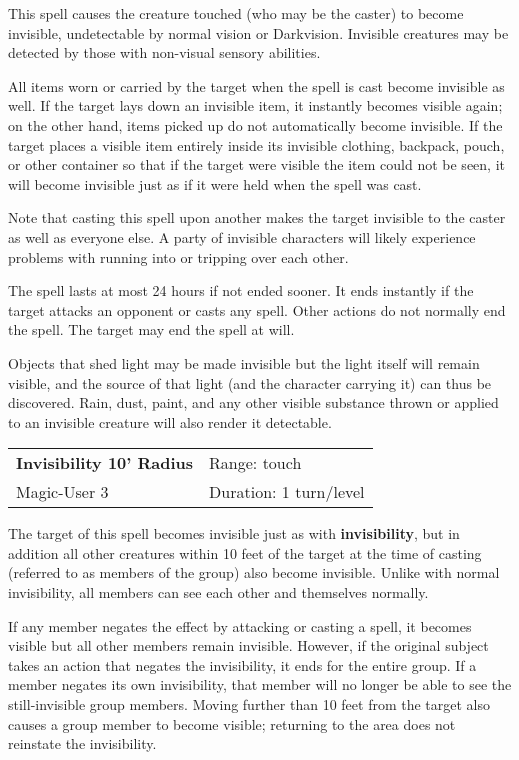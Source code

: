 \documentclass[a4paper,twoside,openany,10pt]{book}
\begin{document}
\begin{multicols}{2}
This spell causes the creature touched (who may be the caster) to become invisible, undetectable by normal vision or Darkvision. Invisible creatures may be detected by those with non-visual sensory abilities.

All items worn or carried by the target when the spell is cast become invisible as well. If the target lays down an invisible item, it instantly becomes visible again; on the other hand, items picked up do not automatically become invisible. If the target places a visible item entirely inside its invisible clothing, backpack, pouch, or other container so that if the target were visible the item could not be seen, it will become invisible just as if it were held when the spell was cast.

Note that casting this spell upon another makes the target invisible to the caster as well as everyone else. A party of invisible characters will likely experience problems with running into or tripping over each other.

The spell lasts at most 24 hours if not ended sooner. It ends instantly if the target attacks an opponent or casts any spell. Other actions do not normally end the spell. The target may end the spell at will. 

Objects that shed light may be made invisible but the light itself will remain visible, and the source of that light (and the character carrying it) can thus be discovered. Rain, dust, paint, and any other visible substance thrown or applied to an invisible creature will also render it detectable.

\smallskip\begin{flushleft} 
	\begin{tabularx}{0.45\textwidth}{@{}m{3.5cm}m{5.5cm}@{}} 
		\textbf{Invisibility 10' Radius} & Range: touch\\
		Magic-User 3 & Duration:  1 turn/level\\
	\end{tabularx}\end{flushleft}

The target of this spell becomes invisible just as with \textbf{invisibility}, but in addition all other creatures within 10 feet of the target at the time of casting (referred to as members of the group) also become invisible. Unlike with normal invisibility, all members can see each other and themselves normally.

If any member negates the effect by attacking or casting a spell, it becomes visible but all other members remain invisible. However, if the original subject takes an action that negates the invisibility, it ends for the entire group. If a member negates its own invisibility, that member will no longer be able to see the still-invisible group members. Moving further than 10 feet from the target also causes a group member to become visible; returning to the area does not reinstate the invisibility.



\end{multicols}
\end{document}

